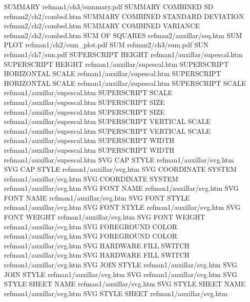 SUMMARY                                 refman1/ch3/summary.pdf
SUMMARY COMBINED SD                     refman2/ch2/combsd.htm
SUMMARY COMBINED STANDARD DEVIATION     refman2/ch2/combsd.htm
SUMMARY COMBINED VARIANCE               refman2/ch2/combsd.htm
SUM OF SQUARES                          refman2/auxillar/ssq.htm
SUM PLOT                                refman1/ch2/sum_plot.pdf
SUM                                     refman2/ch3/sum.pdf
SUN                                     refman1/ch7/sun.pdf
SUPERSCRIPT HEIGHT                      refman1/auxillar/supescal.htm
SUPERSCRIPT HEIGHT                      refman1/auxillar/supescal.htm
SUPERSCRIPT HORIZONTAL SCALE            refman1/auxillar/supescal.htm
SUPERSCRIPT HORIZONTAL SCALE            refman1/auxillar/supescal.htm
SUPERSCRIPT SCALE                       refman1/auxillar/supescal.htm
SUPERSCRIPT SCALE                       refman1/auxillar/supescal.htm
SUPERSCRIPT SIZE                        refman1/auxillar/supescal.htm
SUPERSCRIPT SIZE                        refman1/auxillar/supescal.htm
SUPERSCRIPT VERTICAL SCALE              refman1/auxillar/supescal.htm
SUPERSCRIPT VERTICAL SCALE              refman1/auxillar/supescal.htm
SUPERSCRIPT WIDTH                       refman1/auxillar/supescal.htm
SUPERSCRIPT WIDTH                       refman1/auxillar/supescal.htm
SVG CAP STYLE                           refman1/auxillar/svg.htm
SVG CAP STYLE                           refman1/auxillar/svg.htm
SVG COORDINATE SYSTEM                   refman1/auxillar/svg.htm
SVG COORDINATE SYSTEM                   refman1/auxillar/svg.htm
SVG FONT NAME                           refman1/auxillar/svg.htm
SVG FONT NAME                           refman1/auxillar/svg.htm
SVG FONT STYLE                          refman1/auxillar/svg.htm
SVG FONT STYLE                          refman1/auxillar/svg.htm
SVG FONT WEIGHT                         refman1/auxillar/svg.htm
SVG FONT WEIGHT                         refman1/auxillar/svg.htm
SVG FOREGROUND COLOR                    refman1/auxillar/svg.htm
SVG FOREGROUND COLOR                    refman1/auxillar/svg.htm
SVG HARDWARE FILL SWITCH                refman1/auxillar/svg.htm
SVG HARDWARE FILL SWITCH                refman1/auxillar/svg.htm
SVG JOIN STYLE                          refman1/auxillar/svg.htm
SVG JOIN STYLE                          refman1/auxillar/svg.htm
SVG                                     refman1/auxillar/svg.htm
SVG STYLE SHEET NAME                    refman1/auxillar/svg.htm
SVG STYLE SHEET NAME                    refman1/auxillar/svg.htm
SVG STYLE SHEET                         refman1/auxillar/svg.htm
